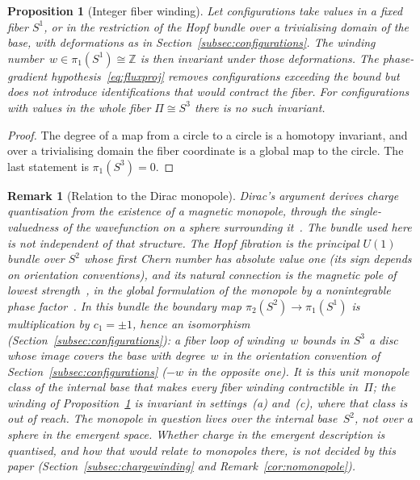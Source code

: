 \documentclass[11pt,a4paper]{article}
\newtheorem{proposition}[theorem]{Proposition}
\newtheorem{remark}[theorem]{Remark}
\begin{document}
      \begin{proposition}[Integer fiber winding]
        \label{prop:charge}
        Let configurations take values in a fixed fiber $S^1$, or in the
        restriction of the Hopf bundle over a trivialising domain of the base,
        with deformations as in Section~\ref{subsec:configurations}.
        The winding number~$w \in \pi_1(S^1) \cong \mathbb{Z}$ is then invariant
        under those deformations.
        The phase-gradient hypothesis~\eqref{eq:fluxproj} removes
        configurations exceeding the bound but does not introduce
        identifications that would contract the fiber.
        For configurations with values in the whole fiber $\Pi \cong S^3$
        there is no such invariant.
      \end{proposition}

      \begin{proof}
        The degree of a map from a circle to a circle is a homotopy invariant,
        and over a trivialising domain the fiber coordinate is a global map to
        the circle.
        The last statement is $\pi_1(S^3) = 0$.
      \end{proof}

      \begin{remark}[Relation to the Dirac monopole]
        \label{rem:dirac}
        Dirac's argument derives charge quantisation from the existence of a
        magnetic monopole, through the single-valuedness of the wavefunction
        on a sphere surrounding it~\cite{Dirac1931}.
        The bundle used here is not independent of that structure.
        The Hopf fibration is the principal $U(1)$ bundle over $S^2$ whose
        first Chern number has absolute value one (its sign depends on
        orientation conventions), and its natural connection is the magnetic
        pole of lowest strength~\cite{Trautman1977}, in the global formulation
        of the monopole by a nonintegrable phase factor~\cite{WuYang1975}.
        In this bundle the boundary map $\pi_2(S^2) \to \pi_1(S^1)$ is
        multiplication by $c_1 = \pm 1$, hence an isomorphism
        (Section~\ref{subsec:configurations}): a fiber loop of winding~$w$
        bounds in $S^3$ a disc whose image covers the base with degree~$w$ in
        the orientation convention of Section~\ref{subsec:configurations}
        ($-w$ in the opposite one).
        It is this unit monopole class of the internal base that makes every
        fiber winding contractible in~$\Pi$; the winding of
        Proposition~\ref{prop:charge} is invariant in settings~(a) and~(c),
        where that class is out of reach.
        The monopole in question lives over the internal base~$S^2$, not over a
        sphere in the emergent space.
        Whether charge in the emergent description is quantised, and how that
        would relate to monopoles there, is not decided by this paper
        (Section~\ref{subsec:chargewinding} and
        Remark~\ref{cor:nomonopole}).
      \end{remark}
\end{document}
